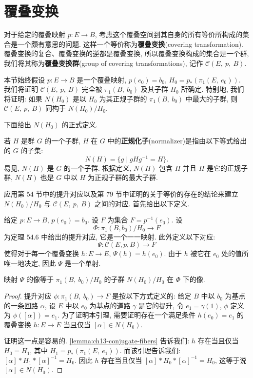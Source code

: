\section{覆叠变换}
\label{ch13-sec81}

对于给定的覆叠映射 $p\colon E\to B$, 考虑这个覆叠空间到其自身的所有等价所构成的集合是一个颇有意思的问题. 这样一个等价称为\textbf{覆叠变换}(covering transformation). 覆叠变换的复合、覆叠变换的逆都是覆叠变换, 所以覆叠变换构成的集合是一个群, 我们将其称为\textbf{覆叠变换群}(group of covering transformations), 记作 $\mathcal{C}(E,\ p,\ B)$.

本节始终假设 $p\colon E\to B$ 是一个覆叠映射, $p(e_{0})=b_{0}$, $H_{0}=p_{*}(\pi_{1}(E,\ e_{0}))$. 我们将证明 $\mathcal{C}(E,\ p,\ B)$ 完全被 $\pi_{1}(B,\ b_{0})$ 及其子群 $H_{0}$ 所确定. 特别地, 我们将证明: 如果 $N(H_{0})$ 是以 $H_{0}$ 为其正规子群的 $\pi_{1}(B,\ b_{0})$ 中最大的子群, 则 $\mathcal{C}(E,\ p,\ B)$ 同构于 $N(H_{0})/H_{0}$.

下面给出 $N(H_{0})$ 的正式定义.

\begin{definition}[正规化子]
\label{definition:ch13-normalizer}
若 $H$ 是群 $G$ 的一个子群, $H$ 在 $G$ 中的\textbf{正规化子}(normalizer)是指由以下等式给出的 $G$ 的子集:
\[
N(H)=\{g\mid gHg^{-1}=H\}.
\]
易见, $N(H)$ 是 $G$ 的一个子群. 根据定义, $N(H)$ 包含 $H$ 并且 $H$ 是它的正规子群, $N(H)$ 也是 $G$ 中以 $H$ 为正规子群的最大子群.
\end{definition}

应用第 54 节中的提升对应以及第 79 节中证明的关于等价的存在的结论来建立 $N(H_{0})/H_{0}$ 与 $\mathcal{C}(E,\ p,\ B)$ 之间的对应. 首先给出以下定义.

给定 $p\colon E\to B$, $p(e_{0})=b_{0}$. 设 $F$ 为集合 $F=p^{-1}(e_{0})$. 设
\[
\Phi\colon\pi_{1}(B,b_{0})/H_{0}\longrightarrow F
\]
为定理 54.6 中给出的提升对应, 它是一个一一映射. 此外定义以下对应:
\[
\Psi\colon\mathcal{C}(E,p,B)\longrightarrow F
\]
使得对于每一个覆叠变换 $h\colon E\to E$, $\Psi(h)=h(e_{0})$. 由于 $h$ 被它在 $e_{0}$ 处的值所唯一地决定, 因此 $\Psi$ 是一个单射.

\begin{lemma}[$\Psi$ 的像]
\label{lemma:ch13-psi-image}
映射 $\Psi$ 的像等于 $\pi_{1}(B,\ b_{0})/H_{0}$ 的子群 $N(H_{0})/H_{0}$ 在 $\Phi$ 下的像.
\end{lemma}

\begin{proof}
提升对应 $\phi\colon\pi_{1}(B,\ b_{0})\to F$ 是按以下方式定义的: 给定 $B$ 中以 $b_{0}$ 为基点的一条回路 $\alpha$, 设 $E$ 中以 $e_{0}$ 为基点的道路 $\gamma$ 是它的提升, 令 $e_{1}=\gamma(1)$, $\phi$ 定义为 $\phi([\alpha])=e_{1}$. 为了证明本引理, 需要证明存在一个满足条件 $h(e_{0})=e_{1}$ 的覆叠变换 $h\colon E\to E$ 当且仅当 $[\alpha]\in N(H_{0})$.

证明这一点是容易的. \cref{lemma:ch13-conjugate-fibers} 告诉我们: $h$ 存在当且仅当 $H_{0}=H_{1}$, 其中 $H_{1}=p_{*}(\pi_{1}(E,\ e_{1}))$. 而该引理告诉我们: $[\alpha]*H_{1}*[\alpha]^{-1}=H_{0}$. 因此 $h$ 存在当且仅当 $[\alpha]*H_{0}*[\alpha]^{-1}=H_{0}$, 这等于说 $[\alpha]\in N(H_{0})$.
\end{proof}

